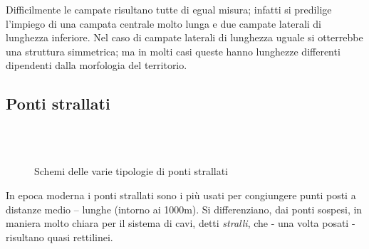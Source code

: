 Difficilmente le campate risultano tutte di egual misura; infatti si predilige l'impiego di una campata centrale molto lunga e due campate laterali di lunghezza inferiore.
Nel caso di campate laterali di lunghezza uguale si otterrebbe una struttura simmetrica; ma in molti casi queste hanno lunghezze differenti dipendenti dalla morfologia del territorio.

\subsection{Ponti strallati}

\begin{figure}
	\centering
	\\
	\\
	\caption{Schemi delle varie tipologie di ponti strallati}
	\label{fig:cable_stayed_bridge}
\end{figure}



In epoca moderna i ponti strallati sono i più usati per congiungere punti posti a distanze medio -- lunghe (intorno ai 1000\si{m}).
Si differenziano, dai ponti sospesi, in maniera molto chiara per il sistema di cavi, detti \emph{stralli}, che - una volta posati - risultano quasi rettilinei.


